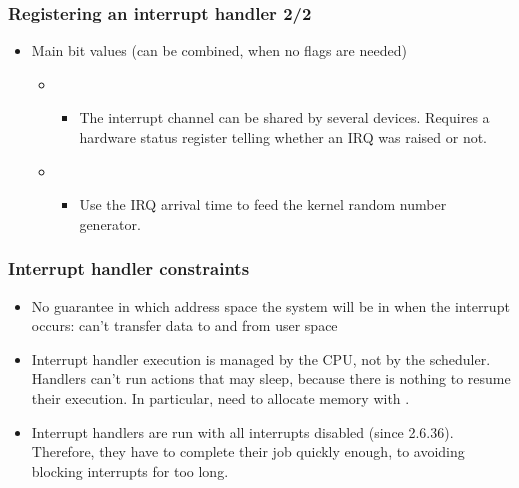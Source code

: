 \begin{frame}
  \frametitle{Registering an interrupt handler 2/2}
  \begin{itemize}
  \item Main  bit values (can be combined, 
    when no flags are needed)
    \begin{itemize}
    \item {}
      \begin{itemize}
      \item The interrupt channel can be shared by several
        devices. Requires a hardware status register telling whether
        an IRQ was raised or not.
      \end{itemize}
    \item {}
      \begin{itemize}
      \item Use the IRQ arrival time to feed the kernel random number
        generator.
      \end{itemize}
    \end{itemize}
  \end{itemize}
\end{frame}

\begin{frame}
  \frametitle{Interrupt handler constraints}
  \begin{itemize}
  \item No guarantee in which address space the system will be in when
    the interrupt occurs: can't transfer data to and from user space
  \item Interrupt handler execution is managed by the CPU, not by the
    scheduler.  Handlers can't run actions that may sleep, because
    there is nothing to resume their execution. In particular, need to
    allocate memory with .
  \item Interrupt handlers are run with all interrupts disabled (since
    2.6.36).  Therefore, they have to complete their job quickly
    enough, to avoiding blocking interrupts for too long.
  \end{itemize}
\end{frame}

